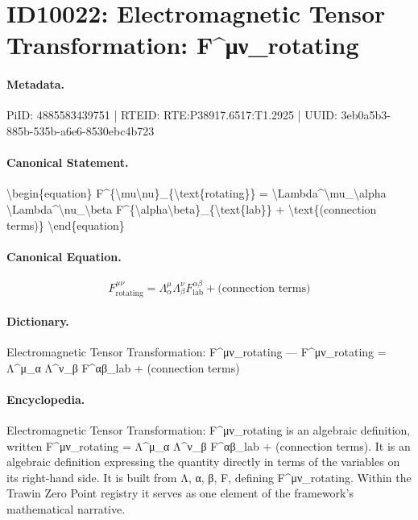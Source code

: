 \section*{ID10022: Electromagnetic Tensor Transformation: F\textasciicircum{}μν\_rotating}
\paragraph{Metadata.}
PiID: 4885583439751 | RTEID: RTE:P38917.6517:T1.2925 | UUID: 3eb0a5b3-885b-535b-a6e6-8530ebc4b723

\paragraph{Canonical Statement.}
\textbackslash{}begin\{equation\} F\textasciicircum{}\{\textbackslash{}mu\textbackslash{}nu\}\_\{\textbackslash{}text\{rotating\}\} = \textbackslash{}Lambda\textasciicircum{}\textbackslash{}mu\_\textbackslash{}alpha \textbackslash{}Lambda\textasciicircum{}\textbackslash{}nu\_\textbackslash{}beta F\textasciicircum{}\{\textbackslash{}alpha\textbackslash{}beta\}\_\{\textbackslash{}text\{lab\}\} + \textbackslash{}text\{(connection terms)\} \textbackslash{}end\{equation\}

\paragraph{Canonical Equation.}
\[
F^{\mu\nu}_{\text{rotating}} = \Lambda^\mu_\alpha \Lambda^\nu_\beta F^{\alpha\beta}_{\text{lab}} + \text{(connection terms)}
\]

\paragraph{Dictionary.}
Electromagnetic Tensor Transformation: F\textasciicircum{}μν\_rotating — F\textasciicircum{}μν\_rotating = Λ\textasciicircum{}μ\_α Λ\textasciicircum{}ν\_β F\textasciicircum{}αβ\_lab + (connection terms)

\paragraph{Encyclopedia.}
Electromagnetic Tensor Transformation: F\textasciicircum{}μν\_rotating is an algebraic definition, written F\textasciicircum{}μν\_rotating = Λ\textasciicircum{}μ\_α Λ\textasciicircum{}ν\_β F\textasciicircum{}αβ\_lab + (connection terms). It is an algebraic definition expressing the quantity directly in terms of the variables on its right-hand side. It is built from Λ, α, β, F, defining F\textasciicircum{}μν\_rotating. Within the Trawin Zero Point registry it serves as one element of the framework's mathematical narrative.
